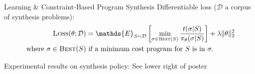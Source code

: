\documentclass[final]{beamer}
\newcommand{\expect}{\mathds{E}} %
\newlength{\onecolwid}
\newlength{\twocolwid}
\newcommand{\expect}{\mathds{E}} %
\begin{document}
\begin{frame}[t]
\begin{columns}[t]
\begin{column}{\twocolwid}
\begin{columns}[t,totalwidth=\twocolwid]
\begin{column}{\onecolwid}
\begin{block}{Learning \& Constraint-Based Program Synthesis}
Differentiable loss ($\mathcal{D}$ a corpus of synthesis problems):
\begin{align}
\textsc{Loss}(\theta ; \mathcal{D})& =  \expect_{S\sim\mathcal{D}}\left[ \min_{\sigma\in \text{\textsc{Best}}(S)}\frac{t(\sigma | S)}{\pi_\theta (\sigma | S)}\right] + \lambda \Vert\theta\Vert_2^2\label{policyLoss}\\
\text{where }  \sigma \in\text{\textsc{Best}}(S) &\text{ if  a minimum cost program for }S \text{ is in }\sigma .\nonumber %
\end{align}

\begin{flushright}
  Experimental results on synthesis policy: See lower right of poster
  \end{flushright}

  \end{block}


\end{column} %

\end{columns} %



\begin{columns}[t,totalwidth=\twocolwid] %


\begin{column}{\onecolwid} %




\end{column} %

\end{columns} %

\end{column} %


\end{columns}
\end{frame}
\end{document}
